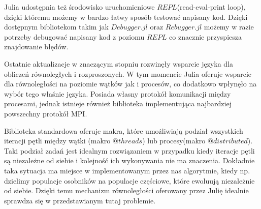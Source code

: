 Julia udostępnia też środowisko uruchomieniowe $REPL$(read-eval-print loop), dzięki któremu możemy w bardzo łatwy sposób testować napisany kod. 
Dzięki dostępnym bibliotekom takim jak $Debugger.jl$ oraz $Rebugger.jl$ możemy w razie potrzeby debugować napisany kod z poziomu $REPL$ co 
znacznie przyspiesza znajdowanie błędów.

Ostatnie aktualizacje w znaczącym stopniu rozwinęły wsparcie języka dla obliczeń równoległych i rozproszonych. W tym momencie Julia oferuje wsparcie dla 
równoległości na poziomie wątków jak i procesów, co dodatkowo wpłynęło na wybór tego właśnie języka. Posiada własny protokół komunikacji między procesami, jednak 
istnieje również biblioteka implementująca najbardziej powszechny protokół MPI.

Biblioteka standardowa oferuje makra, które umożliwiają podział wszystkich iteracji pętli między wątki (makro $@threads$) lub procesy(makro $@distributed$). 
Taki podział zadań jest idealnym rozwiązaniem w przypadku kiedy iteracje pętli są niezależne od siebie i kolejność ich wykonywania nie ma 
znaczenia. Dokładnie taka sytuacja ma miejsce w implementowanym przez nas algorytmie, kiedy np. dzielimy populacje osobników na populacje 
częściowe, które ewoluują niezależnie od siebie. Dzięki temu mechanizm równoległości oferowany przez Julię idealnie sprawdza się w przedstawianym 
tutaj problemie.
